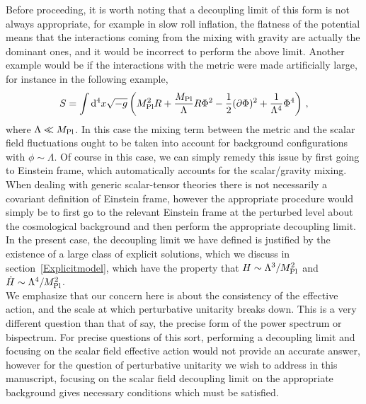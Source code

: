 \documentclass[12pt]{article}
\def\ba{\begin{eqnarray}}
\def\ea{\end{eqnarray}}
\def\mpl{M_{\rm Pl}}
\def\d{\mathrm{d}}
\def\({\left(}
\def\){\right)}
\def\p{\partial}
\def\p{\partial}
\begin{document}
Before proceeding, it is worth noting that a decoupling limit of this form is not always appropriate, for example in slow roll inflation, the flatness of the potential means that the interactions coming from the mixing with gravity are actually the dominant ones, and it would be incorrect to perform the above limit. Another example would be if the interactions with the metric were made artificially large, for instance in the following example,
    \ba
    S=\int \d^4 x \sqrt{-g}\(\mpl^2 R  + \frac{\mpl}{\Lambda}R  \Phi^2 -\frac 12 (\p \Phi)^2+\frac{1}{\Lambda^4} \Phi^4\)\,,
    \ea
 where $\Lambda \ll \mpl$. In this case the mixing term between the metric and the scalar field fluctuations ought to be taken into account for background configurations with $\phi \sim \Lambda$. Of course in this case, we can simply remedy this issue by first going to Einstein frame, which automatically accounts for the scalar/gravity mixing. When dealing with generic scalar-tensor theories there is not necessarily a covariant definition of Einstein frame, however the appropriate procedure would simply be to first go to the relevant Einstein frame at the perturbed level about the cosmological background and then perform the appropriate decoupling limit. In the present case, the decoupling limit we have defined is justified by the existence of a large class of explicit solutions, which we discuss in section~\ref{Explicitmodel}, which have the property that $H \sim \Lambda^3/\mpl^2$ and $\dot H \sim \Lambda^4/\mpl^2$. \\

We emphasize that our concern here is about the consistency of the effective action, and the scale at which perturbative unitarity breaks down. This is a very different question than that of say, the precise form of the power spectrum or bispectrum. For precise questions of this sort, performing a decoupling limit and focusing on the scalar field effective action would not provide an accurate answer, however for the question of perturbative unitarity we wish to address in this manuscript, focusing on the scalar field decoupling limit on the appropriate background gives necessary conditions which must be satisfied.\\
\end{document}
